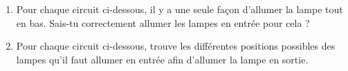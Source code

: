 \documentclass[class=report,crop=false, 12pt]{standalone}
\begin{document}
\begin{activite}
\begin{enumerate}

  
  \item Pour chaque circuit ci-dessous, il y a une seule façon d'allumer la lampe tout en bas. Sais-tu correctement allumer les lampes en entrée pour cela ?
  

  
  \item Pour chaque circuit ci-dessous, trouve les différentes positions possibles des lampes qu'il faut allumer en entrée afin d'allumer la lampe en sortie.


\end{enumerate}

\end{activite}
\end{document}
